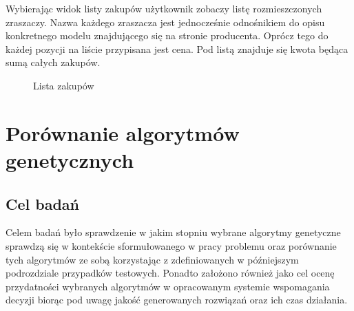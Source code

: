 \documentclass[twoside]{iisthesis}
\begin{document}
Wybierając widok listy zakupów użytkownik zobaczy listę rozmieszczonych zraszaczy. Nazwa każdego zraszacza jest jednocześnie odnośnikiem do opisu konkretnego modelu znajdującego się na stronie producenta. Oprócz tego do każdej pozycji na liście przypisana jest cena. Pod listą znajduje się kwota będąca sumą całych zakupów.
\begin{figure}[!htb]
	\centering
	\caption{Lista zakupów}
	\label{fig:gui_8}
\end{figure}
\section{Porównanie algorytmów genetycznych}
\subsection{Cel badań}
Celem badań było sprawdzenie w jakim stopniu wybrane algorytmy genetyczne sprawdzą się w kontekście sformułowanego w pracy problemu oraz porównanie tych algorytmów ze sobą korzystając z zdefiniowanych w późniejszym podrozdziale przypadków testowych. Ponadto założono również jako cel ocenę przydatności wybranych algorytmów w opracowanym systemie wspomagania decyzji biorąc pod uwagę jakość generowanych rozwiązań oraz ich czas działania.
\end{document}
